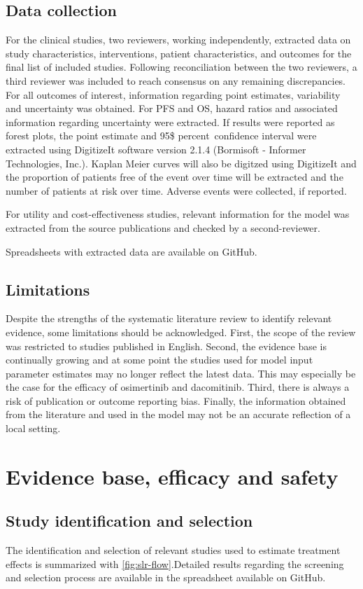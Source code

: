 \documentclass[11pt,final,fleqn]{article}\usepackage[]{graphicx}\usepackage[]{color}
\theoremstyle{plain}
\begin{document}
\begin{appendices}
\subsection{Data collection}
For the clinical studies, two reviewers, working independently, extracted data on study characteristics, interventions, patient characteristics, and outcomes for the final list of included studies. Following reconciliation between the two reviewers, a third reviewer was included to reach consensus on any remaining discrepancies. For all outcomes of interest, information regarding point estimates, variability and uncertainty was obtained. For PFS and OS, hazard ratios and associated information regarding uncertainty were extracted. If results were reported as forest plots, the point estimate and 95\$ percent\ confidence interval were extracted using DigitizeIt software version 2.1.4 (Bormisoft - Informer Technologies, Inc.). Kaplan Meier curves will also be digitzed using DigitizeIt and the proportion of patients free of the event over time will be extracted and the number of patients at risk over time. Adverse events were collected, if reported. 

For utility and cost-effectiveness studies, relevant information for the model was extracted from the source publications and checked by a second-reviewer. 

Spreadsheets with extracted data are available on GitHub.

\subsection{Limitations}
Despite the strengths of the systematic literature review to identify relevant evidence, some limitations should be acknowledged. First, the scope of the review was restricted to studies published in English. Second, the evidence base is continually growing and at some point the studies used for model input parameter estimates may no longer reflect the latest data. This may especially be the case for the efficacy of osimertinib and dacomitinib. Third, there is always a risk of publication or outcome reporting bias. Finally, the information obtained from the literature and used in the model may not be an accurate reflection of a local setting.

\section{Evidence base, efficacy and safety}
\subsection{Study identification and selection} \label{app:study-selection}
The identification and selection of relevant studies used to estimate treatment effects is summarized with \autoref{fig:slr-flow}.Detailed results regarding the screening and selection process are available in the spreadsheet available on GitHub.



\end{appendices}
\end{document}
